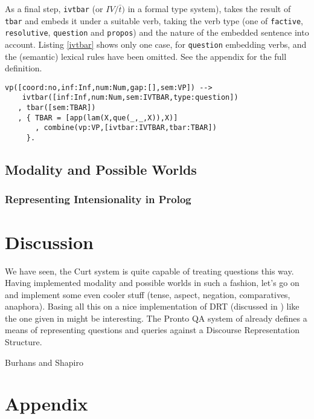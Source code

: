 \documentclass[a4paper]{article}
\newcommand{\abbr}{\textsf} %
\newcommand{\code}[1]{\texttt{#1}} %
\newcommand{\pn}{\textsf} %
\newcommand{\curt}{\pn{Curt}}
\newcommand{\prol}{\pn{Prolog}}
\theoremstyle{remark}
\theoremstyle{remark}
\theoremstyle{definition}
\theoremstyle{definition}
\begin{document}
As a final step, \code{ivtbar} (or $IV/\bar{t})$ in a formal type system), takes
the result of \code{tbar} and embeds it under a suitable verb, taking the verb
type (one of \code{factive}, \code{resolutive}, \code{question} and
\code{propos}) and the nature of the embedded sentence into account. Listing
\ref{ivtbar} shows only one case, for \code{question} embedding verbs, and the
(semantic) lexical rules have been omitted. See the
appendix %
for the full definition.

\begin{lstlisting}[label=ivtbar,caption={A question embedding VP requires its antecedent to be a question.},float]
vp([coord:no,inf:Inf,num:Num,gap:[],sem:VP]) -->
    ivtbar([inf:Inf,num:Num,sem:IVTBAR,type:question])
   , tbar([sem:TBAR])
   , { TBAR = [app(lam(X,que(_,_,X)),X)]
       , combine(vp:VP,[ivtbar:IVTBAR,tbar:TBAR])
     }.
\end{lstlisting}

\subsection{Modality and Possible Worlds}
\label{sec:indices}


\subsubsection{Representing Intensionality in \prol{}}



\section{Discussion}\label{sec:discussion}

We have seen, the \curt{} system is quite capable of treating questions this way.
Having implemented modality and possible worlds in such a fashion, let's go on
and implement some even cooler stuff (tense, aspect, negation, comparatives,
anaphora). Basing all this on a nice implementation of DRT (discussed in
\cite{kampreyle:drt}) like the one given in \cite{blackburnbos:cl2} might be
interesting. The Pronto \abbr{QA} system of \cite{prontoqa} already defines a
means of representing questions and queries against a Discourse Representation
Structure.

Burhans and Shapiro

\section{Appendix}
\end{document}
